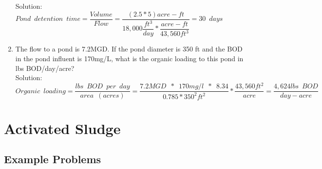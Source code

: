 \documentclass{article}
\begin{document}
\begin{enumerate}
Solution:\\
$Pond \enspace detention \enspace time=\dfrac{Volume}{Flow}=\dfrac{(2.5*5)acre-ft}{18,000\dfrac{ft^3}{day}*\dfrac{acre-ft}{43,560ft^3}}=\boxed{30 \enspace days}$\\ 

\item The flow to a pond is 7.2MGD. If the pond diameter is 350 ft and the BOD in the pond influent is 170mg/L, what is the organic loading to this pond in lbs BOD/day/acre?
\\
Solution:\\
$Organic \enspace loading=\dfrac{lbs \enspace BOD \enspace per \enspace day}{area \enspace (acres)}=\dfrac{7.2MGD \enspace * \enspace 170mg/l \enspace * \enspace 8.34}{0.785*350^2ft^2}*\dfrac{43,560ft^2}{acre}=\boxed{\dfrac{4,624lbs \enspace BOD}{day-acre}}$
\end{enumerate}


\newpage

\section{Activated Sludge}

\subsection{Example Problems} 
\end{document}
